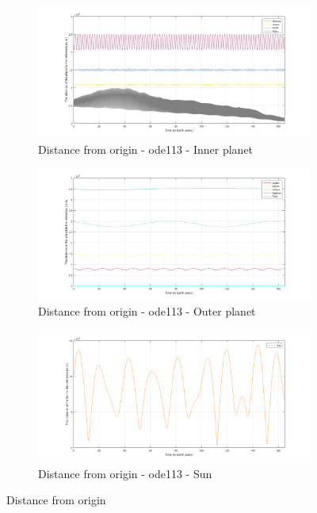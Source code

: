 \documentclass[a4paper]{article}
\begin{document}
\begin{figure}[H]
\centering
\begin{subfigure}{.5\textwidth}
\centering
\includegraphics[width=1\textwidth]{Solar_System_-_ode113_-_ip.png}
\caption{Distance from origin - ode113 - Inner planet}
\label{fig:Solar_System_-_ode113_-_ip}
\end{subfigure}%
\begin{subfigure}{.5\textwidth}
\centering
\includegraphics[width=1\textwidth]{Solar_System_-_ode113_-_op.png}
\caption{Distance from origin - ode113 - Outer planet}
\label{fig:Solar_System_-_ode113_-_op}
\end{subfigure}
\begin{subfigure}{.7\textwidth}
\centering
\includegraphics[width=1\textwidth]{Solar_System_-_ode113_-_sun.png}
\caption{Distance from origin - ode113 - Sun}
\label{fig:Solar_System_-_ode113_-_sun}
\end{subfigure} 
\caption{Distance from origin}
\label{fig:Solar_System_-_ode113_-_all}
\end{figure} 
\end{document}
